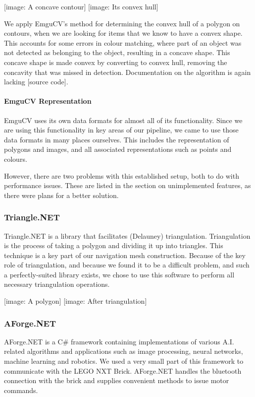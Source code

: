 \documentclass[10pt,twocolumn]{scrartcl}
\begin{document}
[image: A concave contour] [image: Its convex hull]

We apply EmguCV's method for determining the convex hull of a polygon on contours, when we are looking for items that we know to have a convex shape. This accounts for some errors in colour matching, where part of an object was not detected as belonging to the object, resulting in a concave shape. This concave shape is made convex by converting to convex hull, removing the concavity that was missed in detection. Documentation on the algorithm is again lacking [source code].

\paragraph{EmguCV Representation}
EmguCV uses its own data formats for almost all of its functionality. Since we are using this functionality in key areas of our pipeline, we came to use those data formats in many places ourselves. This includes the representation of polygons and images, and all associated representations such as points and colours.

However, there are two problems with this established setup, both to do with performance issues. These are listed in the section on unimplemented features, as there were plans for a better solution.

\subsubsection{Triangle.NET}
Triangle.NET is a library that facilitates (Delauney) triangulation. Triangulation is the process of taking a polygon and dividing it up into triangles. This technique is a key part of our navigation mesh construction. Because of the key role of triangulation, and because we found it to be a difficult problem, and such a perfectly-suited library exists, we chose to use this software to perform all necessary triangulation operations.

[image: A polygon] [image: After triangulation]

\subsubsection{AForge.NET}
AForge.NET is a C\# framework containing implementations of various A.I. related algorithms and applications such as image processing, neural networks, machine learning and robotics. We used a very small part of this framework to communicate with the LEGO NXT Brick. AForge.NET handles the bluetooth connection with the brick and supplies convenient methods to issue motor commands.
\end{document}
